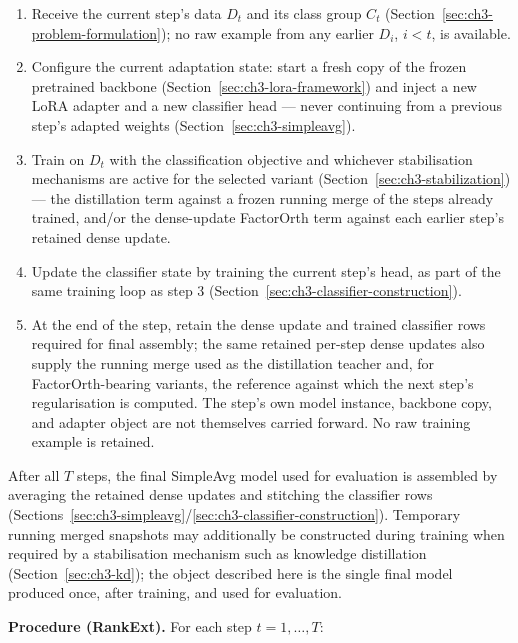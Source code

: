 \begin{enumerate}
\item Receive the current step's data $D_t$ and its class group $C_t$
   (Section~\ref{sec:ch3-problem-formulation}); no raw example from any earlier $D_i$, $i<t$, is
   available.
\item Configure the current adaptation state: start a fresh copy of the
   frozen pretrained backbone (Section~\ref{sec:ch3-lora-framework}) and inject a new LoRA adapter
   and a new classifier head --- never continuing from a previous step's
   adapted weights (Section~\ref{sec:ch3-simpleavg}).
\item Train on $D_t$ with the classification objective and whichever
   stabilisation mechanisms are active for the selected variant
   (Section~\ref{sec:ch3-stabilization}) --- the distillation term against a
   frozen running merge of the steps already trained, and/or the
   dense-update FactorOrth term against each earlier step's retained dense
   update.
\item Update the classifier state by training the current step's head, as
   part of the same training loop as step 3 (Section~\ref{sec:ch3-classifier-construction}).
\item At the end of the step, retain the dense update and trained classifier
   rows required for final assembly; the same retained per-step dense
   updates also supply the running merge used as the distillation teacher
   and, for FactorOrth-bearing variants, the reference against which the
   next step's regularisation is computed. The step's own model instance,
   backbone copy, and adapter object are not themselves carried forward.
   No raw training example is retained.
\end{enumerate}

After all $T$ steps, the final SimpleAvg model used for evaluation is
assembled by averaging the retained dense updates and stitching the
classifier rows (Sections~\ref{sec:ch3-simpleavg}/\ref{sec:ch3-classifier-construction}).
Temporary running merged snapshots may additionally be constructed during
training when required by a stabilisation mechanism such as knowledge
distillation (Section~\ref{sec:ch3-kd}); the object described here is the
single final model produced once, after training, and used for evaluation.

\textbf{Procedure (RankExt).} For each step $t=1,\dots,T$:

